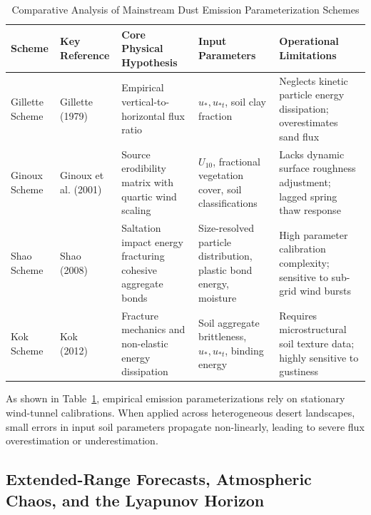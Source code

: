 \begin{table}[H]
\centering
\small
\caption{Comparative Analysis of Mainstream Dust Emission Parameterization Schemes}
\label{tab:dust_schemes_comparison}
\begin{tabularx}{\textwidth}{l p{2.8cm} p{3.2cm} p{3.5cm} X}
\toprule
\textbf{Scheme} & \textbf{Key Reference} & \textbf{Core Physical Hypothesis} & \textbf{Input Parameters} & \textbf{Operational Limitations} \\
\midrule
Gillette Scheme & Gillette (1979)~\cite{gillette1979environmental} & Empirical vertical-to-horizontal flux ratio & $u_*, u_{*t}$, soil clay fraction & Neglects kinetic particle energy dissipation; overestimates sand flux \\
Ginoux Scheme & Ginoux et al. (2001) & Source erodibility matrix with quartic wind scaling & $U_{10}$, fractional vegetation cover, soil classifications & Lacks dynamic surface roughness adjustment; lagged spring thaw response \\
Shao Scheme & Shao (2008)~\cite{shao2008physics} & Saltation impact energy fracturing cohesive aggregate bonds & Size-resolved particle distribution, plastic bond energy, moisture & High parameter calibration complexity; sensitive to sub-grid wind bursts \\
Kok Scheme & Kok (2012)~\cite{kok2012physics} & Fracture mechanics and non-elastic energy dissipation & Soil aggregate brittleness, $u_*, u_{*t}$, binding energy & Requires microstructural soil texture data; highly sensitive to gustiness \\
\bottomrule
\end{tabularx}
\end{table}

As shown in Table~\ref{tab:dust_schemes_comparison}, empirical emission parameterizations rely on stationary wind-tunnel calibrations. When applied across heterogeneous desert landscapes, small errors in input soil parameters propagate non-linearly, leading to severe flux overestimation or underestimation.

\subsection{Extended-Range Forecasts, Atmospheric Chaos, and the Lyapunov Horizon}
\label{subsec:lyapunov_horizon}

